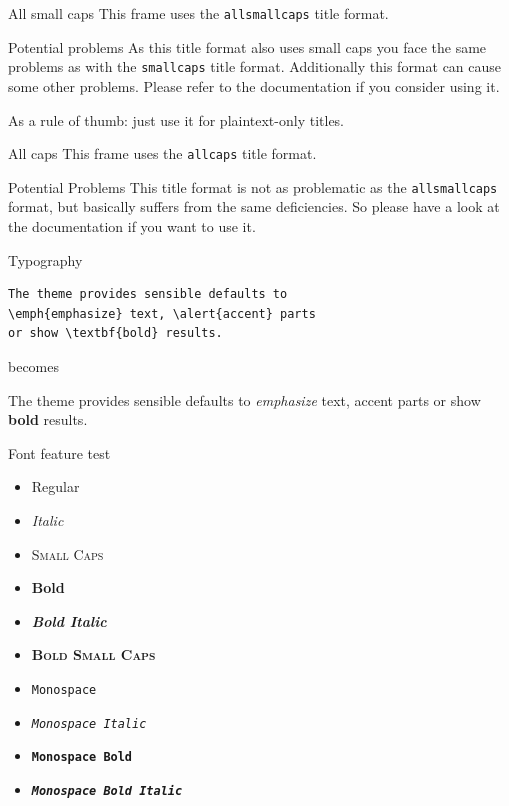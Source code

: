 \documentclass[10pt,spanish]{beamer}
\begin{document}
{
\begin{frame}{All small caps}
This frame uses the \texttt{allsmallcaps} title format.

\begin{alertblock}{Potential problems}
As this title format also uses small caps you face the same problems as with the \texttt{smallcaps} title format. Additionally this format can cause some other problems. Please refer to the documentation if you consider using it.

As a rule of thumb: just use it for plaintext-only titles.
\end{alertblock}
\end{frame}
}

{
\begin{frame}{All caps}
This frame uses the \texttt{allcaps} title format.

\begin{alertblock}{Potential Problems}
This title format is not as problematic as the \texttt{allsmallcaps} format, but basically suffers from the same deficiencies. So please have a look at the documentation if you want to use it.
\end{alertblock}
\end{frame}
}


\begin{frame}[fragile]{Typography}
\begin{verbatim}The theme provides sensible defaults to
\emph{emphasize} text, \alert{accent} parts
or show \textbf{bold} results.\end{verbatim}

\begin{center}becomes\end{center}

The theme provides sensible defaults to \emph{emphasize} text,
\alert{accent} parts or show \textbf{bold} results.
\end{frame}

\begin{frame}{Font feature test}
\begin{itemize}
\item Regular
\item \textit{Italic}
\item \textsc{Small Caps}
\item \textbf{Bold}
\item \textbf{\textit{Bold Italic}}
\item \textbf{\textsc{Bold Small Caps}}
\item \texttt{Monospace}
\item \texttt{\textit{Monospace Italic}}
\item \texttt{\textbf{Monospace Bold}}
\item \texttt{\textbf{\textit{Monospace Bold Italic}}}
\end{itemize}
\end{frame}
\end{document}
